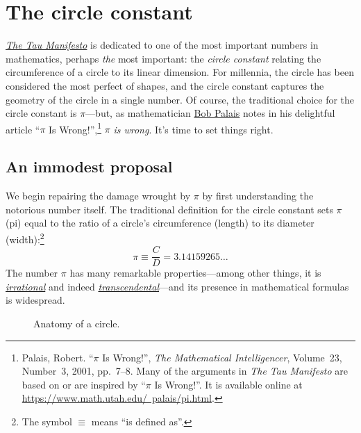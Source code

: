 \section{The circle constant} %
\label{sec:the_circle_constant}

\href{https://tauday.com/tau-manifesto}{\emph{The Tau Manifesto}} is dedicated to one of the most important numbers in mathematics, perhaps \emph{the} most important: the \emph{circle constant} relating the circumference of a circle to its linear dimension. For millennia, the circle has been considered the most perfect of shapes, and the circle constant captures the geometry of the circle in a single number. Of course, the traditional choice for the circle constant is $\pi$---but, as mathematician \href{https://www.math.utah.edu/~palais/}{Bob Palais} notes in his delightful article ``$\pi$ Is Wrong!'',\footnote{Palais, Robert. ``$\pi$ Is Wrong!'', \emph{The Mathematical Intelligencer}, Volume~23, Number~3, 2001, pp.~7--8. Many of the arguments in \emph{The Tau Manifesto} are based on or are inspired by ``$\pi$ Is Wrong!''. It is available online at \href{https://www.math.utah.edu/~palais/pi.html}{https://www.math.utah.edu/~palais/pi.html}.} $\pi$ \emph{is wrong}. It's time to set things right.

  \subsection{An immodest proposal} %
  \label{sec:an_immodest_proposal}

We begin repairing the damage wrought by $\pi$ by first understanding the notorious number itself. The traditional definition for the circle constant sets $\pi$ (pi) equal to the ratio of a circle's circumference (length) to its diameter (width):\footnote{The symbol $\equiv$ means ``is defined as''.}
\begin{equation}
\label{eq:pi}
\pi \equiv \frac{C}{D} = 3.14159265\ldots
\end{equation}
The number $\pi$ has many remarkable properties---among other things, it is \href{https://en.wikipedia.org/wiki/Irrational_number}{\emph{irrational}} and indeed \href{https://en.wikipedia.org/wiki/Transcendental_number}{\emph{transcendental}}---and its presence in mathematical formulas is widespread.

\begin{figure}
\caption{Anatomy of a circle.\label{fig:circle}}
\end{figure}

